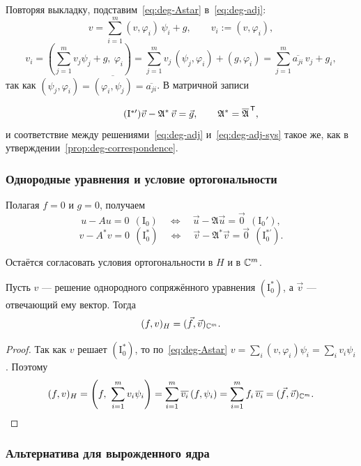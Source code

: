 Повторяя выкладку, подставим~\eqref{eq:deg-Astar} в~\eqref{eq:deg-adj}:
\[
  v = \sum_{i=1}^{m} (v, \varphi_i)\,\psi_i + g ,
  \qquad v_i := (v, \varphi_i) ,
\]
\[
  v_i = \left(\sum_{j=1}^{m} v_j \psi_j + g,\ \varphi_i\right)
      = \sum_{j=1}^{m} v_j\, (\psi_j, \varphi_i) + (g, \varphi_i)
      = \sum_{j=1}^{m} \overline{a_{ji}}\, v_j + g_i ,
\]
так как $(\psi_j, \varphi_i) = \overline{(\varphi_i,\psi_j)}
= \overline{a_{ji}}$. В матричной записи

\begin{equation}\tag{I$^{*\prime}$}\label{eq:deg-adj-sys}
  \vec v - \mathfrak{A}^*\, \vec v = \vec g ,
  \qquad \mathfrak{A}^* = \overline{\mathfrak{A}}^{\,\mathsf{T}} ,
\end{equation}
и соответствие между решениями~\eqref{eq:deg-adj} и~\eqref{eq:deg-adj-sys}
такое же, как в утверждении~\ref{prop:deg-correspondence}.

\subsubsection*{Однородные уравнения и условие ортогональности}

Полагая $f = 0$ и $g = 0$, получаем
\[
  u - Au = 0 \ \ (\mathrm{I}_0)
  \quad\Longleftrightarrow\quad
  \vec u - \mathfrak{A}\vec u = \vec 0 \ \ (\mathrm{I}_0') ,
\]
\[
  v - A^* v = 0 \ \ (\mathrm{I}_0^*)
  \quad\Longleftrightarrow\quad
  \vec v - \mathfrak{A}^*\vec v = \vec 0 \ \ (\mathrm{I}_0^{*\prime}) .
\]

Остаётся согласовать условия ортогональности в $H$ и в $\mathbb{C}^m$.

\begin{lemma}\label{lem:deg-ortho}
Пусть $v$ — решение однородного сопряжённого уравнения
$(\mathrm{I}_0^*)$, а $\vec v$ — отвечающий ему вектор. Тогда
\[
  (f, v)_H = (\vec f, \vec v)_{\mathbb{C}^m} .
\]
\end{lemma}

\begin{proof}
Так как $v$ решает $(\mathrm{I}_0^*)$, то по~\eqref{eq:deg-Astar}
$v = \sum_i (v,\varphi_i)\psi_i = \sum_i v_i \psi_i$. Поэтому
\[
  (f, v)_H
  = \left(f,\ \sum_{i=1}^{m} v_i \psi_i\right)
  = \sum_{i=1}^{m} \overline{v_i}\,(f, \psi_i)
  = \sum_{i=1}^{m} f_i\, \overline{v_i}
  = (\vec f, \vec v)_{\mathbb{C}^m} .
\]
\end{proof}

\subsubsection*{Альтернатива для вырожденного ядра}

